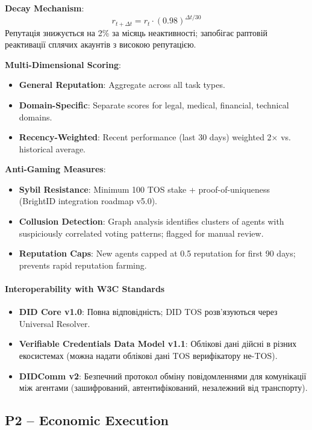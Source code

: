 \documentclass[11pt]{article}
\begin{document}
\textbf{Decay Mechanism}:
\begin{equation}
r_{t+\Delta t} = r_t \cdot (0.98)^{\Delta t / 30}
\end{equation}
Репутація знижується на 2\% за місяць неактивності; запобігає раптовій реактивації сплячих акаунтів з високою репутацією.

\textbf{Multi-Dimensional Scoring}:
\begin{itemize}[noitemsep]
  \item \textbf{General Reputation}: Aggregate across all task types.
  \item \textbf{Domain-Specific}: Separate scores for legal, medical, financial, technical domains.
  \item \textbf{Recency-Weighted}: Recent performance (last 30 days) weighted 2$\times$ vs. historical average.
\end{itemize}

\textbf{Anti-Gaming Measures}:
\begin{itemize}[noitemsep]
  \item \textbf{Sybil Resistance}: Minimum 100 TOS stake + proof-of-uniqueness (BrightID integration roadmap v5.0).
  \item \textbf{Collusion Detection}: Graph analysis identifies clusters of agents with suspiciously correlated voting patterns; flagged for manual review.
  \item \textbf{Reputation Caps}: New agents capped at 0.5 reputation for first 90 days; prevents rapid reputation farming.
\end{itemize}

\paragraph{Interoperability with W3C Standards}
\begin{itemize}[noitemsep]
  \item \textbf{DID Core v1.0}: Повна відповідність; DID TOS розв'язуються через Universal Resolver.
  \item \textbf{Verifiable Credentials Data Model v1.1}: Облікові дані дійсні в різних екосистемах (можна надати облікові дані TOS верифікатору не-TOS).
  \item \textbf{DIDComm v2}: Безпечний протокол обміну повідомленнями для комунікації між агентами (зашифрований, автентифікований, незалежний від транспорту).
\end{itemize}

\subsection{P2 -- Economic Execution}
\label{sec:pillar-economic}
\end{document}
